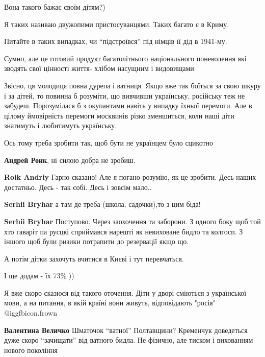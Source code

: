 \begin{itemize}
Вона такого бажає своїм дітям?)

Я таких називаю двужопими пристосуванцями. Таких багато є в Криму.

Питайте в таких випадках, чи \enquote{підстроївся} під німців її дід в 1941-му.


Сумно, але це готовий продукт багатолітнього національного поневолення які
зводять свої цінності життя- хлібом насущним і видовищами


Звісно, ця молодиця повна дурепа і ватниця. Якщо вже так боїться за свою шкуру
і за дітей, то повинна б розуміти, що вивчивши українську, російську теж не
забудеш. Порозумілася б з окупантами навіть у випадку їхньої перемоги. Але в
цілому ймовірність перемоги москвинів різко зменшиться, коли наші діти
знатимуть і любитимуть українську.

Ось тому треба зробити так, щоб бути не українцем було сцикотно

\begin{itemize} %
\textbf{Андрей Роик}, ні силою добра не зробиш.


\textbf{Roik Andriy} Гарно сказано! Але я погано розумію, як це зробити. Десь наших достатньо. Десь - так собі. Десь і зовсім мало..

\textbf{Serhii Bryhar} а там де треба (школа, садочки),то з цим біда!

\textbf{Serhii Bryhar} Поступово. Через заохочення та заборони.
З одного боку щоб той хто гаваріт па русцкі сприймався нарешті як невиховане бидло та колгосп. З іншого щоб були ризики потрапити до резервації якщо що.
\end{itemize} %

А потім дітки захочуть вчитися в Києві і тут перевчаться.

І ще додам - їх 73\% ))


Я вже скоро сказюся від такого оточення. Діти у дворі сміються з української
мови, а на питання, в якій країні вони живуть, відповідають "росія"  @igg{fbicon.frown} 

\begin{itemize} %
\textbf{Валентина Величко} Шматочок \enquote{ватної} Полтавщини? Кременчук доведеться дуже скоро \enquote{зачищати} від ватного бидла. Не фізично, але тиском і вихованням нового покоління


\end{itemize}
\end{itemize}

